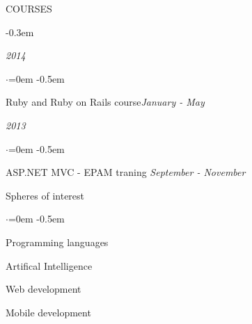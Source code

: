 \documentclass{resume} %
\begin{document}

\begin{rSection}{COURSES}

\begin{description} \itemsep -0.3em
  \item[RubyRoid Labs]\hfill {\em 2014}
  \begin{list}{$\cdot$}{\leftmargin=0em} %
    \itemsep -0.5em \vspace{-0.5em} %
    \item Ruby and Ruby on Rails course\hfill {\em January - May}
  \end{list}
  \item[EPAM Systems]\hfill {\em 2013}
  \begin{list}{$\cdot$}{\leftmargin=0em} %
    \itemsep -0.5em \vspace{-0.5em} %
    \item ASP.NET MVC - EPAM traning \hfill {\em  September - November}
  \end{list}
\end{description}

\end{rSection}


\begin{rSection}{Spheres of interest}
  \smallskip
  \begin{list}{$\cdot$}{\leftmargin=0em} %
    \itemsep -0.5em \vspace{-0.5em} %
  \item Programming languages
  \item Artifical Intelligence
  \item Web development
  \item Mobile development
  \end{list}
\end{rSection}

\end{document}
